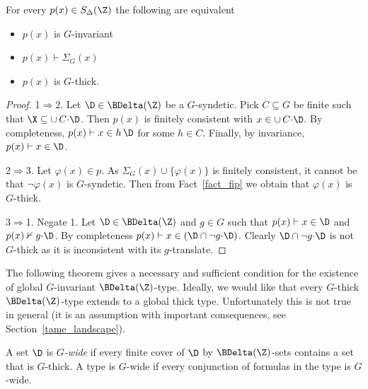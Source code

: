 
\begin{theorem}\label{thm_syndetic_invariant}
  For every $p(x)\in S_\Delta(\Z)$ the following are equivalent
  \begin{itemize}
    \item[1.] $p(x)$ is $G$-invariant
    \item[2.] $p(x)\vdash\Sigma_G(x)$
    \item[3.] $p(x)$ is $G$-thick.
  \end{itemize}
\end{theorem}

\begin{proof}
  1$\Rightarrow$2.
  Let $\D\in\BDelta(\Z)$ be a $G$-syndetic.
  Pick $C\subseteq G$ be finite such that $\X\subseteq\cup\,C{\cdot}\D$.
  Then $p(x)$ is finitely consistent with $x\in\cup\,C{\cdot}\D$.
  By completeness, $p(x)\vdash x\in h\,\D$ for some $h\in C$.
  Finally, by invariance, $p(x)\vdash x\in\D$.
  
  2$\Rightarrow$3.
  Let $\varphi(x)\in p$.
  As $\Sigma_G(x)\cup\{\varphi(x)\}$ is finitely consistent, it cannot be that $\neg\varphi(x)$ is $G$-syndetic.
  Then from Fact~\ref{fact_fip} we obtain that $\varphi(x)$ is $G$-thick.

  3$\Rightarrow$1.
  Negate 1.
  Let $\D\in\BDelta(\Z)$ and $g\in G$ such that $p(x)\vdash x\in\D$ and $p(x)\nvdash g{\cdot}\D$.
  By completeness $p(x)\vdash x\in(\D\cap\neg g{\cdot}\D)$.
  Clearly $\D\cap \neg g{\cdot}\D$ is not $G$-thick as it is inconsistent with its $g$-translate.
\end{proof}

The following theorem gives a necessary and sufficient condition for the  existence of global $G$-invariant $\BDelta(\Z)$-type.
Ideally, we would like that every $G$-thick $\BDelta(\Z)$-type extends to a global thick type.
Unfortunately this is not true in general (it is an assumption with important consequences, see Section~\ref{tame_landscape}).

A set $\D$ is \emph{$G$-wide\/} if every finite cover of $\D$ by $\BDelta(\Z)$-sets contains a set that is $G$-thick.
A type is $G$-wide if every conjunction of formulas in the type is $G$-wide.

